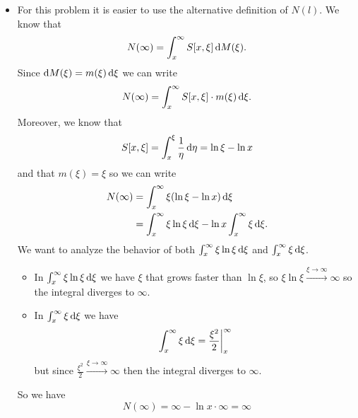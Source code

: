 \documentclass[12pt]{article}
\begin{document}
\begin{enumerate}
\begin{itemize}
\begin{align*}
				\Sigma(\infty)&=\int_{x}^{\infty}\frac{\xi^{2}-x^{2}}{2}\cdot\frac{1}{\xi}\dif\xi\\
				&=\unmezz\int_{x}^{\infty}\left(\xi-\frac{x^{2}}{\xi}\right)\dif\xi\\
				&=\unmezz\ubracketthin{\int_{x}^{\infty}\xi\dif\xi}_{=\infty}-x^{2}\ubracketthin{\int_{x}^{\infty}\frac{1}{\xi}\dif\xi}_{=\infty}.
			\end{align*}
			Since $\int_{x}^{\infty}\frac{1}{\xi}\dif\xi$ grows logarithmically and this it is slower than $\int_{x}^{\infty}\xi\dif\xi$ then we have
			\begin{equation*}
				\Sigma(\infty)=\infty.
			\end{equation*}
			\item For this problem it is easier to use the alternative definition of $N(l)$. We know that
			\begin{equation*}
				N(\infty)=\int_{x}^{\infty}S[x,\xi]\mathop{}\!\mathrm{d} M(\xi).
			\end{equation*}
			Since $\mathop{}\!\mathrm{d} M(\xi)=m(\xi)\mathop{}\!\mathrm{d}\xi$ we can write
			\begin{equation*}
				N(\infty)=\int_{x}^{\infty}S[x,\xi]\cdot m(\xi)\mathop{}\!\mathrm{d}\xi.
			\end{equation*}
			Moreover, we know that $$S[x,\xi]=\int_{x}^{\xi}\frac{1}{\eta}\mathop{}\!\mathrm{d}\eta=\ln\xi-\ln x$$ and that $m(\xi)=\xi$ so we can write
			\begin{align*}
				N(\infty)&=\int_{x}^{\infty}\xi(\ln\xi-\ln x)\mathop{}\!\mathrm{d}\xi\\
				&=\int_{x}^{\infty}\xi\ln\xi\mathop{}\!\mathrm{d}\xi-\ln x\int_{x}^{\infty}\xi\mathop{}\!\mathrm{d}\xi.
			\end{align*}
			We want to analyze the behavior of both $\int_{x}^{\infty}\xi\ln\xi\mathop{}\!\mathrm{d}\xi$ and $\int_{x}^{\infty}\xi\dif\xi$.
			\begin{itemize}
				\item In $\int_{x}^{\infty}\xi\ln\xi\mathop{}\!\mathrm{d}\xi$ we have $\xi$ that grows faster than $\ln\xi$, so $\xi\ln\xi\xrightarrow{\xi\to\infty}\infty$ so the integral diverges to $\infty$.
				\item In $\int_{x}^{\infty}\xi\dif\xi$ we have
				\begin{equation*}
					\int_{x}^{\infty}\xi\mathop{}\!\mathrm{d}\xi=\frac{\xi^{2}}{2}\bigg|_{x}^{\infty}
				\end{equation*}
				but since $\frac{\xi^{2}}{2}\xrightarrow{\xi\to\infty}\infty$ then the integral diverges to $\infty$.
			\end{itemize}
			So we have
			\begin{equation*}
				N(\infty)=\infty-\ln x\cdot\infty=\infty

\end{equation*}
\end{itemize}
\end{enumerate}
\end{document}
